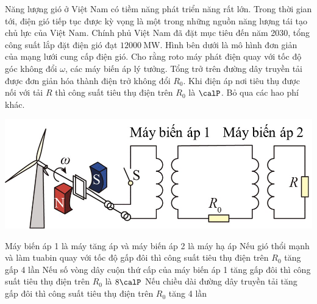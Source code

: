 \begin{ex}
	Năng lượng gió ở Việt Nam có tiềm năng phát triển năng rất lớn. Trong thời gian tới, điện gió tiếp tục được kỳ vọng là một trong những nguồn năng lượng tái tạo chủ lực của Việt Nam. Chính phủ Việt Nam đã đặt mục tiêu đến năm 2030, tổng công suất lắp đặt điện gió đạt $\SI{12000}{\mega\watt}$. Hình bên dưới là mô hình đơn giản của mạng lưới cung cấp điện gió. Cho rằng roto máy phát điện quay với tốc độ góc không đổi $\omega$, các máy biến áp lý tưởng. Tổng trở trên đường dây truyền tải được đơn giản hóa thành điện trở không đổi $R_0$. Khi điện áp nơi tiêu thụ được nối với tải $R$ thì công suất tiêu thụ điện trên $R_0$ là $\calP$. Bỏ qua các hao phí khác.
	\begin{center}
		\includegraphics[scale=0.6]{../figs/THPTQG-002-2}
	\end{center}
	\choiceTF
	{\True Máy biến áp 1 là máy tăng áp và máy biến áp 2 là máy hạ áp}
	{\True Nếu gió thổi mạnh và làm tuabin quay với tốc độ gấp đôi thì công suất tiêu thụ điện trên $R_0$ tăng gấp 4 lần}
	{Nếu số vòng dây cuộn thứ cấp của máy biến áp 1 tăng gấp đôi thì công suất tiêu thụ điện trên $R_0$ là $8\calP$}
	{Nếu chiều dài đường dây truyền tải tăng gấp đôi thì công suất tiêu thụ điện trên $R_0$ tăng 4 lần}
\end{ex}
